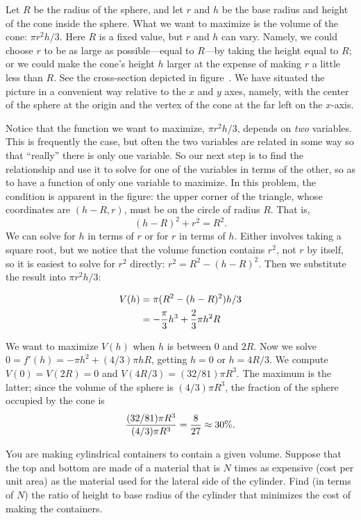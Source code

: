 \begin{solution}
Let $R$ be the radius of the sphere, and let $r$ and $h$ be the base radius
and height of the cone inside the sphere.  What we want to maximize is the
volume of the cone: $\pi r^2h/3$.  Here $R$ is a fixed value, but
$r$ and $h$ can vary.  Namely, we could choose $r$ to be as large as
possible---equal to $R$---by taking the height equal to $R$; or we
could make the cone's height $h$ larger at the expense of making $r$ a
little less than $R$.  See the cross-section depicted in
figure~. We
have situated the picture in a convenient way relative to the $x$ and
$y$ axes, namely, with the center of the sphere at the origin and the
vertex of the cone at the far left on the $x$-axis.

Notice that the function we want to maximize, $\pi r^2h/3$,
depends on {\it two\/} variables.  This is frequently the case, but
often the two variables are related in some way so that ``really''
there is only one variable. So our next step is to
find the relationship and use it to solve for one of the variables in
terms of the other, so as to have a function of only one variable to
maximize.  In this problem, the condition is apparent in the figure:
the upper corner of the triangle, whose coordinates are $(h-R,r)$,
must be on the circle of radius $R$.  That is,
$$
      (h-R)^2+r^2=R^2.
$$ 
We can solve for $h$ in terms of $r$ or for $r$ in terms of $h$.
Either involves taking a square root, but we notice that the volume
function contains $r^2$, not $r$ by itself, so it is easiest to solve
for $r^2$ directly: $r^2=R^2-(h-R)^2$.
Then we substitute the result into $\pi r^2h/3$:

\begin{align*}
 V(h)&=\pi(R^2-(h-R)^2)h/3 \\
&=-{\pi\over3}h^3+{2\over3}\pi h^2R
\end{align*}
 
We want to maximize $V(h)$ when $h$ is between 0 and $2R$.  Now we
solve $0=f'(h)=-\pi h^2+(4/3)\pi h R$, getting $h=0$ or $h=4R/3$. 
We compute $V(0)=V(2R)=0$ and $V(4R/3)=(32/81)\pi R^3$. The maximum is
the latter; since the volume of the sphere is $(4/3)\pi R^3$, the
fraction of the sphere occupied by the cone is 
$${(32/81)\pi R^3\over (4/3)\pi R^3}={8\over 27}\approx 30\%.$$
\end{solution}

\begin{example}
You are making cylindrical containers to contain a given volume.  Suppose
that the top and bottom are made of a material that is $N$ times as
expensive (cost per unit area) as the material used for the lateral side of
the cylinder.  Find (in terms of $N$) the ratio of height to base radius of
the cylinder that minimizes the cost of making the containers.
\end{example}

